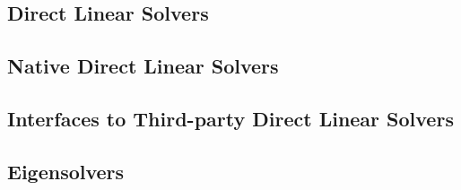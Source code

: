 \subsection{Direct Linear Solvers}

\subsection{Native Direct Linear Solvers}

\subsection{Interfaces to Third-party Direct Linear Solvers}

\subsection{Eigensolvers}

